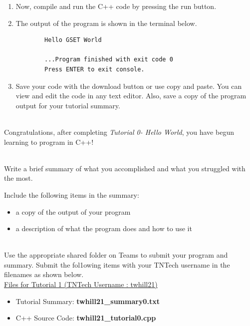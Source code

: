 \documentclass[12pt]{article}
\newcommand{\MNUM}{0} %
\begin{document}
\begin{description}[labelindent=1cm]
\begin{enumerate}
		\item Now, compile and run the C++ code by pressing the run button.
		
		\item	
		The output of the program is shown in the terminal below.
		\begin{verbatim} 
		Hello GSET World
		
		...Program finished with exit code 0
		Press ENTER to exit console.
		\end{verbatim}
	
		\item Save your code with the download button or use copy and paste. You can view and edit the code in any text editor. Also, save a copy of the program output for your tutorial summary. 

	\end{enumerate}

\item[\textbf{\underline{Tutorial Complete:}}] \hfill \vspace{3mm}\\ 
	Congratulations, after completing {\it Tutorial \MNUM - Hello World}, you have begun learning to program in C++! \\


\newpage
\item[\textbf{\underline{Tutorial Summary:}}] \hfill \vspace{3mm}\\ 
Write a brief summary of what you accomplished and what you struggled with the most. 

Include the following items in the summary:
\begin{itemize}

\item a copy of the output of your program
\item a description of what the program does and how to use it

\end{itemize}


\item[\textbf{\underline{Submission on Teams:}}] \hfill \vspace{3mm}\\ 
Use the appropriate shared folder on Teams to submit your program and summary. Submit the fol1owing items with your TNTech username in the filenames as shown below. \vspace{0mm}\\

\underline{Files for Tutorial 1 (TNTech Username : twhill21)}

\begin{itemize}

\item Tutorial Summary: \textbf{ twhill21\_summary0.txt}

\item C++ Source Code: \textbf{ twhill21\_tutorial0.cpp}

\end{itemize}


\end{description}
\end{document}
